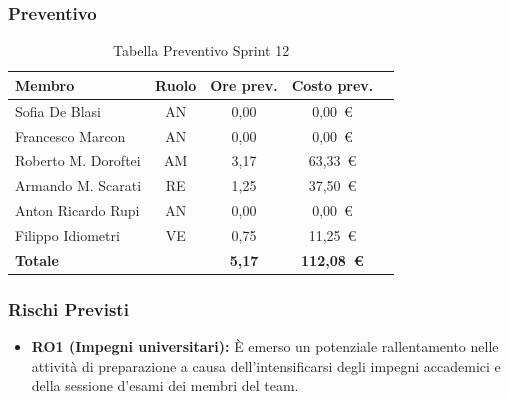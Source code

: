 \subsubsection{Preventivo}
\begin{table}[H]
    \centering
    \renewcommand{\arraystretch}{1.3}
    \begin{tabularx}{\textwidth}{|X|c|c|c|r|}
        \hline
        \textbf{Membro} & \textbf{Ruolo} & \textbf{Ore prev.} & \textbf{Costo prev.} \\
        \hline
        Sofia De Blasi       & AN & 0,00 & 0{,}00~\euro \\
        Francesco Marcon     & AN & 0,00 & 0{,}00~\euro \\
        Roberto M. Doroftei  & AM & 3,17 & 63{,}33~\euro \\
        Armando M. Scarati   & RE & 1,25 & 37{,}50~\euro \\
        Anton Ricardo Rupi   & AN & 0,00 & 0{,}00~\euro \\
        Filippo Idiometri    & VE & 0,75 & 11{,}25~\euro \\
        \hline
        \textbf{Totale}      &    & \textbf{5,17} & \textbf{112{,}08~\euro} \\
        \hline
    \end{tabularx}
    \caption{Tabella Preventivo Sprint 12} 
\end{table}

\subsubsection{Rischi Previsti}
\begin{itemize}
    \item \textbf{RO1 (Impegni universitari):} È emerso un potenziale rallentamento nelle attività di preparazione a causa dell'intensificarsi degli impegni accademici e della sessione d'esami dei membri del team.
\end{itemize}


